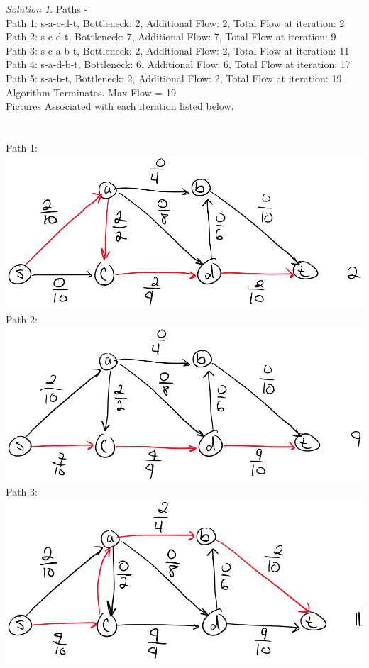 \documentclass[12pt]{article}
\theoremstyle{remark}
\newtheorem*{solution}{Solution}
\begin{document}
\begin{enumerate}
\begin{enumerate}
\begin{solution}
Paths - \\
Path 1: s-a-c-d-t, Bottleneck: 2, Additional Flow: 2, Total Flow at iteration: 2\\
Path 2: s-c-d-t, Bottleneck: 7, Additional Flow: 7, Total Flow at iteration: 9\\
Path 3: s-c-a-b-t, Bottleneck: 2, Additional Flow: 2, Total Flow at iteration: 11\\
Path 4: s-a-d-b-t, Bottleneck: 6, Additional Flow: 6, Total Flow at iteration: 17\\
Path 5: s-a-b-t, Bottleneck: 2, Additional Flow: 2, Total Flow at iteration: 19\\
Algorithm Terminates. Max Flow = 19 \\
Pictures Associated with each iteration listed below.\\ \\ \\
Path 1: \\
\includegraphics[scale=0.6]{Q1_P1.png}\\
Path 2: \\
\includegraphics[scale=0.6]{Q1_P2.png}\\
Path 3: \\
\includegraphics[scale=0.6]{Q1_P3.png}\\

\end{solution}
\end{enumerate}
\end{enumerate}
\end{document}
